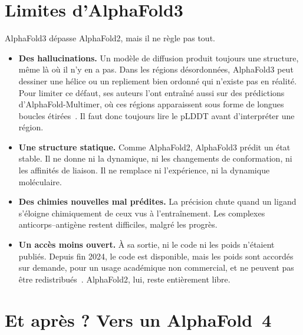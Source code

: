 
\section{Limites d'AlphaFold3}

AlphaFold3 dépasse AlphaFold2, mais il ne règle pas tout.
\begin{itemize}
  \item \textbf{Des hallucinations.} Un modèle de diffusion produit toujours une structure, même là où il n'y en a pas. Dans les régions désordonnées, AlphaFold3 peut dessiner une hélice ou un repliement bien ordonné qui n'existe pas en réalité. Pour limiter ce défaut, ses auteurs l'ont entraîné aussi sur des prédictions d'AlphaFold-Multimer, où ces régions apparaissent sous forme de longues boucles étirées~\cite{abramson2024}. Il faut donc toujours lire le pLDDT avant d'interpréter une région.
  \item \textbf{Une structure statique.} Comme AlphaFold2, AlphaFold3 prédit un état stable. Il ne donne ni la dynamique, ni les changements de conformation, ni les affinités de liaison. Il ne remplace ni l'expérience, ni la dynamique moléculaire.
  \item \textbf{Des chimies nouvelles mal prédites.} La précision chute quand un ligand s'éloigne chimiquement de ceux vus à l'entraînement. Les complexes anticorps--antigène restent difficiles, malgré les progrès.
  \item \textbf{Un accès moins ouvert.} À sa sortie, ni le code ni les poids n'étaient publiés. Depuis fin 2024, le code est disponible, mais les poids sont accordés sur demande, pour un usage académique non commercial, et ne peuvent pas être redistribués~\cite{alphafold3_github}. AlphaFold2, lui, reste entièrement libre.
\end{itemize}

\section{Et après ? Vers un \og AlphaFold~4 \fg{}}


